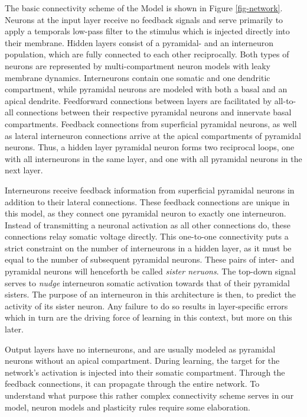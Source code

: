 The basic connectivity scheme of the Model is shown in Figure \ref{fig-network}. Neurons at the input layer receive no
feedback signals and serve primarily to apply a temporals low-pass filter to the stimulus which is injected directly
into their membrane.  Hidden layers consist of a pyramidal- and an interneuron population, which are fully connected to
each other reciprocally. Both types of neurons are represented by multi-compartment neuron models with leaky membrane
dynamics. Interneurons contain one somatic and one dendritic compartment, while pyramidal neurons are modeled with both
a basal and an apical dendrite.  Feedforward connections between layers are facilitated by all-to-all connections
between their respective pyramidal neurons and innervate basal compartments. Feedback connections from superficial
pyramidal neurons, as well as lateral interneuron connections arrive at the apical compartments of pyramidal neurons.
Thus, a hidden layer pyramidal neuron forms two reciprocal loops, one with all interneurons in the same layer, and one
with all pyramidal neurons in the next layer.

Interneurons receive feedback information from superficial pyramidal neurons in addition to their lateral connections.
These feedback connections are unique in this model, as they connect one pyramidal neuron to exactly one interneuron.
Instead of transmitting a neuronal activation as all other connections do, these connections relay somatic voltage
directly. This one-to-one connectivity puts a strict constraint on the number of interneurons in a hidden layer, as it
must be equal to the number of subsequent pyramidal neurons. These pairs of inter- and pyramidal neurons will henceforth
be called \textit{sister neruons}. The top-down signal serves to \textit{nudge} interneuron somatic activation towards
that of their pyramidal sisters. The purpose of an interneuron in this architecture is then, to predict the activity of
its sister neuron. Any failure to do so results in layer-specific errors which in turn are the driving force of learning
in this context, but more on this later.

Output layers have no interneurons, and are usually modeled as pyramidal neurons without an apical compartment. During
learning, the target for the network's activation is injected into their somatic compartment. Through the feedback
connections, it can propagate through the entire network. To understand what purpose this rather complex connectivity
scheme serves in our model, neuron models and plasticity rules require some elaboration.


